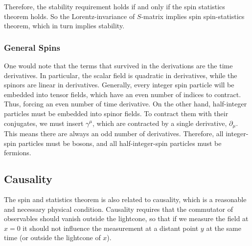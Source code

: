 \documentclass[11pt]{article}
\theoremstyle{definition}
\begin{document}
Therefore, the stability requirement holds if and only if the spin statistics theorem holds. So the Lorentz-invariance of $S$-matrix implies spin spin-statistics theorem, which in turn implies stability.
\subsubsection{General Spins}
One would note that the terms that survived in the derivations are the time derivatives. In particular, the scalar field is quadratic in derivatives, while the spinors are linear in derivatives. Generally, every integer spin particle will be embedded into tensor fields, which have an even number of indices to contract. Thus, forcing an even number of time derivative. On the other hand, half-integer particles must be embedded into spinor fields. To contract them with their conjugates, we must insert $\gamma^\mu$, which are contracted by a single derivative, $\partial_\mu$. This means there are always an odd number of derivatives. Therefore, all integer-spin particles must be bosons, and all half-integer-spin particles must be fermions.

\subsection{Causality}
The spin and statistics theorem is also related to causality, which is a reasonable and necessary physical condition. Causality requires that the commutator of observables should vanish outside the lightcone, so that if we measure the field at $x=0$ it should not influence the measurement at a distant point $y$ at the same time (or outside the lightcone of $x$).
\end{document}
